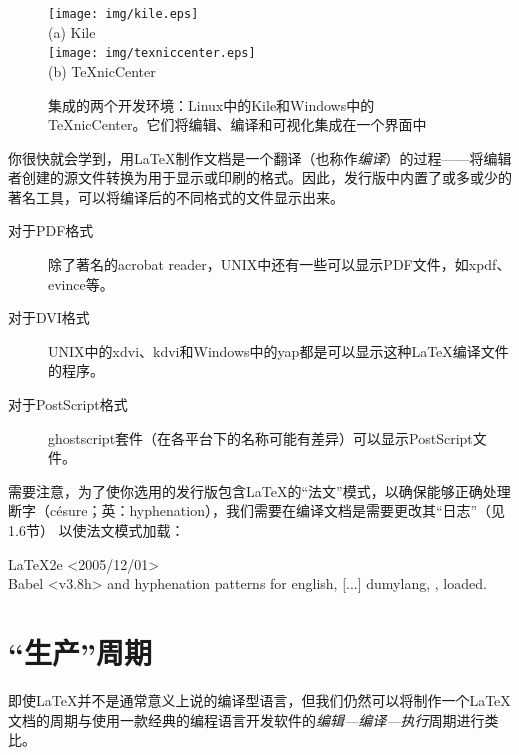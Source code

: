 \begin{figure}%
    \centering
    \texttt{[image: img/kile.eps]}\\
    (a) Kile\\
    \texttt{[image: img/texniccenter.eps]}\\
    (b) \TeX nicCenter
    \caption{集成的两个开发环境：Linux中的Kile和Windows中的\TeX nicCenter。它们将编辑、编译和可视化集成在一个界面中}
    \label{fig:1.1}
\end{figure}

你很快就会学到，用\LaTeX 制作文档是一个翻译（也称作\textit{编译}）的过程——将编辑者创建的源文件转换为用于显示或印刷的格式。因此，发行版中内置了或多或少的著名工具，可以将编译后的不同格式的文件显示出来。

\begin{description}

\item[对于PDF格式]除了著名的\textsf{acrobat reader}，UNIX中还有一些可以显示PDF文件，如\textsf{xpdf}、\textsf{evince}等。

\item[对于DVI格式]UNIX中的\textsf{xdvi}、\textsf{kdvi}和Windows中的\textsf{yap}都是可以显示这种\LaTeX 编译文件的程序。

\item[对于PostScript格式]\textsf{ghostscript}套件（在各平台下的名称可能有差异）可以显示PostScript文件。

\end{description}

\begin{exclamation}
    需要注意，为了使你选用的发行版包含\LaTeX 的“法文”模式，以确保能够正确处理断字（césure；英：hyphenation），我们需要在编译文档是需要更改其“日志”（见1.6节）%
    以使法文模式加载：

    \begin{dmd}
    LaTeX2e <2005/12/01>\\
    Babel <v3.8h> and hyphenation patterns for english, [...] dumylang, , loaded.
    \end{dmd}
\end{exclamation}

\section{“生产”周期}

即使\LaTeX 并不是通常意义上说的编译型语言，但我们仍然可以将制作一个\LaTeX 文档的周期与使用一款经典的编程语言开发软件的\textit{编辑—编译—执行}周期进行类比。


